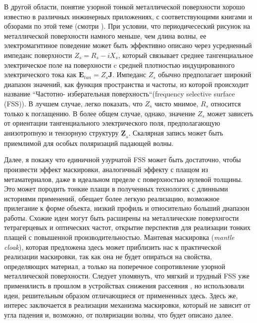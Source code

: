 \documentclass[12pt,a4paper]{article}
\begin{document}
В другой области, понятие узорной тонкой металлической поверхности хорошо известно
в различных инжинерных приложениях, с соответствующими книгами и обзорами по этой
теме (смотри \cite{14}). При условии, что периодичесеский рисунок на металлической
поверхности намного меньше, чем длина волны, ее электромагнтиное поведение может
быть эффективно описано через усредненный импеданс поверхности $Z_s = R_s - iX_s$,
который связывает среднее тангенциальное электрическое поле на поверхности c 
средней плотностью индуцированного электрического тока как $\textbf{E}_{tan}=
Z_s\textbf{J}$. Импеданс $Z_s$ обычно предполагает широкий диапазон значений, как
функция пространства и частоты, из которой происходит название ``Частотно-
изберательная поверхность``(frequency selective surface (FSS)). 
В лучшем случае, легко показать, что $Z_s$ чисто мнимое, $R_s$
относится только к поглащению. В более общем случае, однако, значение $Z_s$ может зависеть от ориентации
тангенциального электрического поля, предполагающую анизотропную и тензорную структуру 
$\underline{\textbf{Z}}_s$. Скалярная запись может быть приемлимой для особых поляризаций падающей волны.

Далее, я покажу что единичной узурчатой FSS может быть достаточно, чтобы произвести эффект маскировки,
аналогичный эффекту с плащом из метаматериалов, даже в идеальном пределе с поверхностью нулевой толщины.
Это может породить тонкие плащи в полученных технологих с длинными историями применений,
обещает более легкую реализацию, возможное прилегание к форме объекта, низкий профиль и относительно
больший диапазон работы. Схожие идеи могут быть расширены на металлические поверхнгости тетрагерцевых
и оптических частот, открытие перспектив для реализации тонких плащей с повышенной производительностью.
Мантевая маскировка (\textit{mantle cloak}), которая предложена здесь может приблизить нас к практической
реализации маскировки, так как она не будет опираться на свойства, определяющих материал, а только на
поперечное сопротивление узорной металлической поверхности. Следует упомянуть, что мягкий и трудный
FSS уже применялисть в прошлом в устройствах снижения рассеяния \cite{15}, но использовали идеи,
решительным образом отличающиеся от примененных здесь. Здесь же, интерес заключается в реализации
механизма маскировки, который не зависит от угла падения и, возможно, от поляризации волны, что будет
описано далее.
\end{document}
